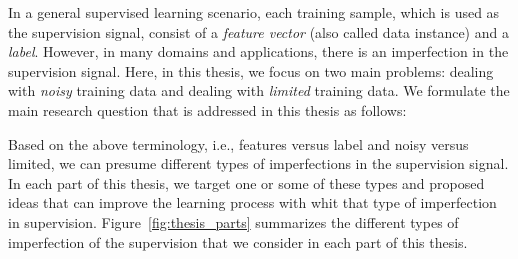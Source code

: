 In a general supervised learning scenario, each training sample, which is used as the supervision signal, consist of a \emph{feature vector} (also called data instance) and a \emph{label}. However, in many domains and applications, there is an imperfection in the supervision signal. Here, in this thesis, we focus on two main problems: dealing with \emph{noisy} training data and dealing with \emph{limited} training data. 
We formulate the main research question that is addressed in this thesis as follows:

Based on the above terminology, i.e., features versus label and noisy versus limited, we can presume different types of imperfections in the supervision signal. In each part of this thesis, we target one or some of these types and proposed ideas that can improve the learning process with whit that type of imperfection in supervision. 
Figure~\ref{fig:thesis_parts} summarizes the different types of imperfection of the supervision that we consider in each part of this thesis.
